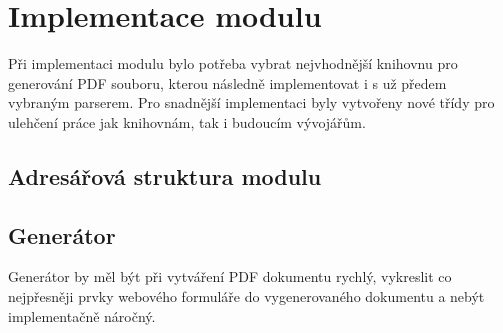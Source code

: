 \DeclarePairedDelimiter\ceil{\lceil}{\rceil}
\DeclarePairedDelimiter\floor{\lfloor}{\rfloor}

\chapter{Implementace modulu}
Při implementaci modulu bylo potřeba vybrat nejvhodnější knihovnu pro generování PDF souboru, kterou následně implementovat i s už předem vybraným parserem. Pro snadnější implementaci byly vytvořeny nové třídy pro ulehčení práce jak knihovnám, tak i budoucím vývojářům.
\section{Adresářová struktura modulu}

\section{Generátor}
Generátor by měl být při vytváření PDF dokumentu rychlý, vykreslit co nejpřesněji prvky webového formuláře do vygenerovaného dokumentu a nebýt implementačně náročný.  
